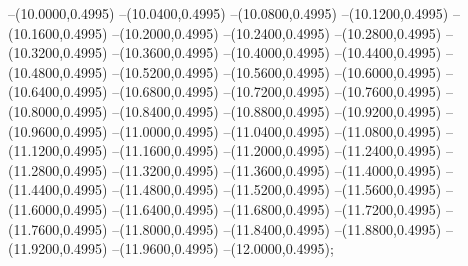 {	--(10.0000,0.4995)
	--(10.0400,0.4995)
	--(10.0800,0.4995)
	--(10.1200,0.4995)
	--(10.1600,0.4995)
	--(10.2000,0.4995)
	--(10.2400,0.4995)
	--(10.2800,0.4995)
	--(10.3200,0.4995)
	--(10.3600,0.4995)
	--(10.4000,0.4995)
	--(10.4400,0.4995)
	--(10.4800,0.4995)
	--(10.5200,0.4995)
	--(10.5600,0.4995)
	--(10.6000,0.4995)
	--(10.6400,0.4995)
	--(10.6800,0.4995)
	--(10.7200,0.4995)
	--(10.7600,0.4995)
	--(10.8000,0.4995)
	--(10.8400,0.4995)
	--(10.8800,0.4995)
	--(10.9200,0.4995)
	--(10.9600,0.4995)
	--(11.0000,0.4995)
	--(11.0400,0.4995)
	--(11.0800,0.4995)
	--(11.1200,0.4995)
	--(11.1600,0.4995)
	--(11.2000,0.4995)
	--(11.2400,0.4995)
	--(11.2800,0.4995)
	--(11.3200,0.4995)
	--(11.3600,0.4995)
	--(11.4000,0.4995)
	--(11.4400,0.4995)
	--(11.4800,0.4995)
	--(11.5200,0.4995)
	--(11.5600,0.4995)
	--(11.6000,0.4995)
	--(11.6400,0.4995)
	--(11.6800,0.4995)
	--(11.7200,0.4995)
	--(11.7600,0.4995)
	--(11.8000,0.4995)
	--(11.8400,0.4995)
	--(11.8800,0.4995)
	--(11.9200,0.4995)
	--(11.9600,0.4995)
	--(12.0000,0.4995);
}
